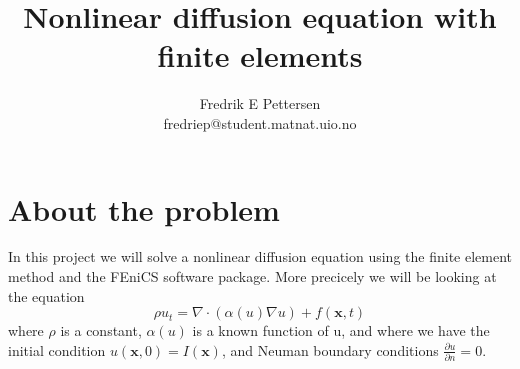\documentclass[a4paper,english, 10pt, twoside]{article}
\title{Nonlinear diffusion equation with finite elements}
\author{Fredrik E Pettersen\\ fredriep@student.matnat.uio.no}
\renewcommand{\d}{\partial}
\begin{document}
\maketitle

\tableofcontents
\newpage
\section{About the problem}
In this project we will solve a nonlinear diffusion equation using the finite element method and the FEniCS software package.
More precicely we will be looking at the equation
\begin{equation}\label{eq}
 \rho u_t = \nabla\cdot(\alpha(u)\nabla u) +f(\mathbf{x},t)
\end{equation}
where $\rho$ is a constant, $\alpha(u)$ is a known function of u, and where we have the initial condition $u(\mathbf{x},0) = I(\mathbf{x})$, 
and Neuman boundary conditions $\frac{\d u}{\d n} = 0$.
\end{document}

